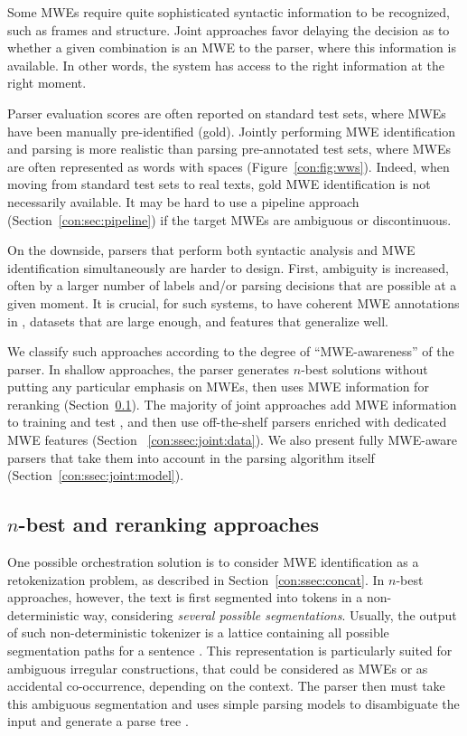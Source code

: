 \documentclass[output=paper]{langsci/langscibook}
\begin{document}
Some MWEs require quite sophisticated syntactic information to be recognized, such as  frames and  structure.
Joint approaches favor delaying the decision as to whether a given combination is an MWE to the parser, where this information is available.
In other words, the system has access to the right information at the right moment. %


Parser evaluation scores are often reported on standard test sets, where MWEs have been manually pre-identified (gold).
Jointly performing MWE identification and parsing is more realistic than parsing pre-annotated test sets, where MWEs are often represented as words with spaces (Figure~\ref{con:fig:wws}).
Indeed, when moving from standard test sets to real texts, gold MWE identification is not necessarily available.
It may be hard to use a pipeline approach (Section~\ref{con:sec:pipeline}) if the target MWEs are ambiguous or discontinuous.

On the downside, parsers that perform both syntactic analysis and MWE identification simultaneously are harder to design.
First, ambiguity is increased, often by a larger number of labels and\slash or parsing decisions that are possible at a given moment.
It is crucial, for such systems, to have coherent MWE annotations in , datasets that are large enough, and features that generalize well. 

We classify such approaches according to the degree of  ``MWE-awareness'' of the parser.
In shallow approaches, the parser generates $n$-best solutions without putting any particular emphasis on MWEs, then uses MWE information for reranking (Section~\ref{con:ssec:joint:rerank}).
The majority of joint approaches add MWE information to training and test , and then use off-the-shelf parsers enriched with dedicated MWE features (Section~ \ref{con:ssec:joint:data}). 
We also present fully MWE-aware parsers that take them into account in the parsing algorithm itself (Section~\ref{con:ssec:joint:model}).


\subsection{$n$-best and reranking approaches}
\label{con:ssec:joint:rerank}

One possible orchestration solution is to consider MWE identification as a retokenization problem, as described in Section~\ref{con:ssec:concat}.
In $n$-best approaches, however, the text is first segmented into tokens in a non-deterministic way, considering \emph{several possible segmentations}.
Usually, the output of such non-deterministic tokenizer is a lattice containing all possible segmentation paths for a sentence \citep{sagot:2005}.
This representation is particularly suited for ambiguous irregular constructions, that could be considered as MWEs or as accidental co-occurrence, depending on the context.
The parser then must take this ambiguous segmentation and uses simple parsing models to disambiguate the input and generate a parse tree \citep{nasr:11}.
\end{document}
